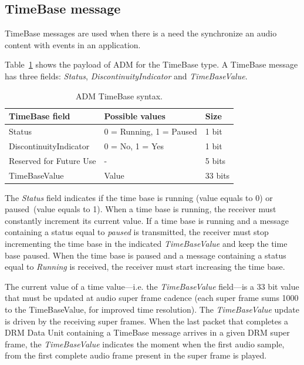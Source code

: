 \documentclass[11pt]{article}
\begin{document}
\begin{appendices}
\subsection{TimeBase message}

TimeBase messages are used when there is a need the synchronize an audio
content with events in an application.

Table~\ref{tabletb} shows the payload of ADM for the TimeBase type.
A TimeBase message has three fields: \emph{Status},
\emph{DiscontinuityIndicator} and \emph{TimeBaseValue}.

\begin{table}[H]
\centering
\caption{ADM TimeBase syntax.}
\label{tabletb}
\begin{tabular}{|l|l|l|}
  \hline
  TimeBase field & Possible values & Size\\
  \hline
  Status & 0 = Running, 1 = Paused & 1 bit \\
  \hline
  DiscontinuityIndicator & 0 = No, 1 = Yes & 1 bit \\
  \hline
  Reserved for Future Use & - & 5 bits \\
  \hline
  TimeBaseValue & Value & 33 bits \\
  \hline
\end{tabular}
\end{table}

The \emph{Status} field indicates if the time base is running (value equals
to 0) or paused~(value equals to 1).
When a time base is running, the receiver must constantly increment its
current value.
If a time base is running and a message containing a status equal to
\emph{paused} is transmitted, the receiver must stop incrementing the time
base in the indicated \emph{TimeBaseValue} and keep the time base paused.
When the time base is paused and a message containing a status equal to
\emph{Running} is received, the receiver must start increasing the time
base.

The current value of a time value---i.e. the \emph{TimeBaseValue} field---is
a 33 bit value that must be updated at audio super frame cadence (each super
frame sums 1000 to the TimeBaseValue, for improved time resolution).
The \emph{TimeBaseValue} update is driven by the receiving super
frames.
When the last packet that completes a DRM Data Unit containing a TimeBase
message arrives in a given DRM super frame, the \emph{TimeBaseValue}
indicates the moment when the first audio sample, from the first complete
audio frame present in the super frame is played.


\end{appendices}
\end{document}
